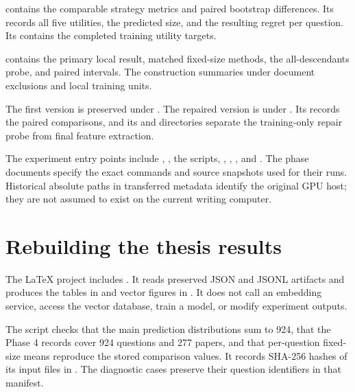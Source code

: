 \begin{description}[style=nextline,leftmargin=0pt]
\item[Expected regret]
contains the comparable strategy metrics and paired bootstrap
differences. Its  records all five
utilities, the predicted size, and the resulting regret per question.
Its  contains the completed
training utility targets.

\item[Local routing]
contains the primary local result, matched fixed-size methods,
the all-descendants probe, and paired intervals.
The construction summaries under  document exclusions
and local training units.

\item[Frozen context feature]
The first version is preserved under
.
The repaired version is under
.
Its  records the paired
comparisons, and its  and 
directories separate the training-only repair probe from final
feature extraction.
\end{description}

The experiment entry points include ,
, the  scripts,
,
,
, and
. The phase documents specify
the exact commands and source snapshots used for their runs.
Historical absolute paths in transferred metadata identify the
original GPU host; they are not assumed to exist on the current
writing computer.

\section{Rebuilding the thesis results}
The LaTeX project includes
. It reads preserved JSON and JSONL
artifacts and produces the tables in  and
vector figures in . It does not call an
embedding service, access the vector database, train a model, or
modify experiment outputs.

The script checks that the main prediction distributions sum to
924, that the Phase 4 records cover 924 questions and 277 papers,
and that per-question fixed-size means reproduce the stored
comparison values. It records SHA-256 hashes of its input files
in . The diagnostic
cases preserve their question identifiers in that manifest.

